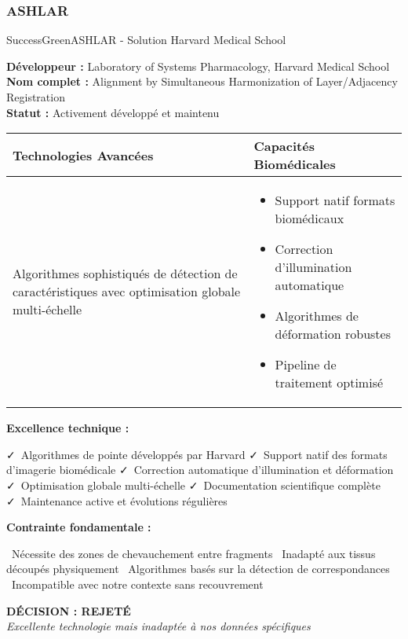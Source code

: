 \documentclass[11pt,a4paper]{report}
\newcommand{\pro}[1]{\textcolor{SuccessGreen}{\faCheck\ #1}}
\newcommand{\con}[1]{\textcolor{DangerRed}{\faTimes\ #1}}
\begin{document}
\subsubsection{ASHLAR}

\begin{techbox}{SuccessGreen}{ASHLAR - Solution Harvard Medical School}

\textbf{Développeur :} Laboratory of Systems Pharmacology, Harvard Medical School \\
\textbf{Nom complet :} Alignment by Simultaneous Harmonization of Layer/Adjacency Registration \\
\textbf{Statut :} Activement développé et maintenu

\vspace{0.5cm}

\begin{tabularx}{\textwidth}{|X|X|}
\hline
\rowcolor{LightGray}
\textbf{Technologies Avancées} & \textbf{Capacités Biomédicales} \\
\hline
Algorithmes sophistiqués de détection de caractéristiques avec optimisation globale multi-échelle &
\begin{itemize}[nosep]
\item Support natif formats biomédicaux
\item Correction d'illumination automatique
\item Algorithmes de déformation robustes
\item Pipeline de traitement optimisé
\end{itemize} \\
\hline
\end{tabularx}

\vspace{0.5cm}

\textbf{Excellence technique :}
\begin{itemize}[leftmargin=*]
    \pro{Algorithmes de pointe développés par Harvard}
    \pro{Support natif des formats d'imagerie biomédicale}
    \pro{Correction automatique d'illumination et déformation}
    \pro{Optimisation globale multi-échelle}
    \pro{Documentation scientifique complète}
    \pro{Maintenance active et évolutions régulières}
\end{itemize}

\textbf{Contrainte fondamentale :}
\begin{itemize}[leftmargin=*]
    \con{Nécessite des zones de chevauchement entre fragments}
    \con{Inadapté aux tissus découpés physiquement}
    \con{Algorithmes basés sur la détection de correspondances}
    \con{Incompatible avec notre contexte sans recouvrement}
\end{itemize}

\begin{center}
\textbf{\textcolor{WarningOrange}{DÉCISION : REJETÉ}}\\
\textit{Excellente technologie mais inadaptée à nos données spécifiques}
\end{center}

\end{techbox}
\end{document}
